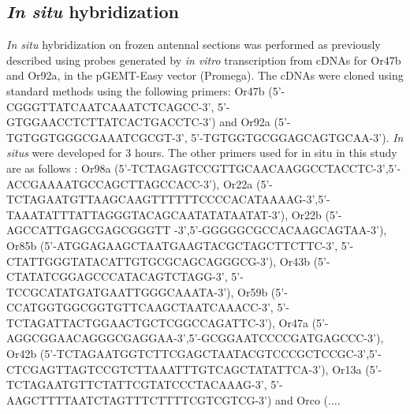 \subsection*{\emph{In situ} hybridization}

\emph{In situ} hybridization on frozen antennal sections was performed as previously described \cite{ein_Morozov_Rzhetsky_Axel_1999} using probes generated by \emph{in vitro} transcription from cDNAs for Or47b and Or92a, in the pGEMT-Easy vector (Promega).
The cDNAs were cloned using standard methods using the following primers: Or47b (5'-CGGGTTATCAATCAAATCTCAGCC-3', 5'-GTGGAACCTCTTATCACTGACCTC-3') and Or92a (5'-TGTGGTGGGCGAAATCGCGT-3', 5'-TGTGGTGCGGAGCAGTGCAA-3').
\emph{In situs} were developed for 3 hours. The other primers used for in situ in this study are as follows : Or98a (5'-TCTAGAGTCCGTTGCAACAAGGCCTACCTC-3',5'-ACCGAAAATGCCAGCTTAGCCACC-3'), Or22a (5'-TCTAGAATGTTAAGCAAGTTTTTTCCCCACATAAAAG-3',5'-TAAATATTTATTAGGGTACAGCAATATATAATAT-3'), Or22b (5'-AGCCATTGAGCGAGCGGGTT -3',5'-GGGGGCGCCACAAGCAGTAA-3'), Or85b (5'-ATGGAGAAGCTAATGAAGTACGCTAGCTTCTTC-3', 5'-CTATTGGGTATACATTGTGCGCAGCAGGGCG-3'), Or43b (5'-CTATATCGGAGCCCATACAGTCTAGG-3', 5'-TCCGCATATGATGAATTGGGCAAATA-3'), Or59b (5'-CCATGGTGGCGGTGTTCAAGCTAATCAAACC-3', 5'-TCTAGATTACTGGAACTGCTCGGCCAGATTC-3'), Or47a (5'-AGGCGGAACAGGGCGAGGAA-3',5'-GCGGAATCCCCGATGAGCCC-3'), Or42b (5'-TCTAGAATGGTCTTCGAGCTAATACGTCCCGCTCCGC-3',5'-CTCGAGTTAGTCCGTCTTAAATTTGTCAGCTATATTCA-3'), Or13a (5'-TCTAGAATGTTCTATTCGTATCCCTACAAAG-3', 5'-AAGCTTTTAATCTAGTTTCTTTTCGTCGTCG-3') and Orco (.... 